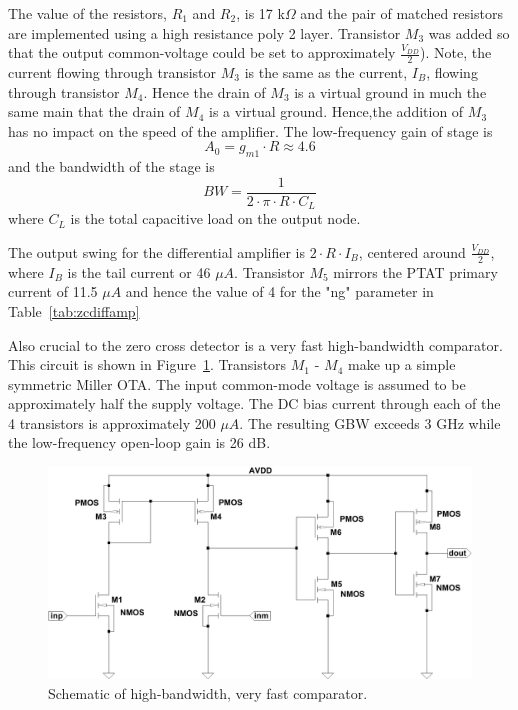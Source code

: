 \documentclass[12pt,oneside,final]{siuethesis}
\theoremstyle{definition}
\begin{document}
The value of the resistors, $R_1$ and $R_2$, is 17 k$\Omega$ and the pair of matched resistors are implemented using a high resistance poly 2 layer. Transistor $M_3$ was added so that the output common-voltage could be set to approximately $\frac{V_{DD}}{2}$). Note, the current flowing through transistor $M_3$ is the same as the current, $I_B$, flowing through transistor $M_4$. Hence the drain of $M_3$ is a virtual ground in much the same main that the drain of $M_4$ is a virtual ground. Hence,the addition of $M_3$ has no impact on the speed of the amplifier. The low-frequency gain of stage is
\begin{equation}
A_0 = g_{m1} \cdot R \approx 4.6
\end{equation}
and the bandwidth of the stage is 
\begin{equation}
BW = \frac{1}{2 \cdot \pi \cdot R \cdot C_L}
\end{equation}
where $C_L$ is the total capacitive load on the output node. 
\par The output swing for the differential amplifier is $ 2 \cdot R \cdot I_B$, centered around $\frac{V_{DD}}{2}$, where $I_B$ is the tail current or 46 $\mu A$.  Transistor $M_5$ mirrors the PTAT primary current of 11.5 $\mu A$ and hence the value of 4 for the "ng" parameter in Table~\ref{tab:zcdiffamp}
\par Also crucial to the zero cross detector is a very fast high-bandwidth comparator. This circuit is shown in Figure~\ref{fig:zccomp}. Transistors $M_1$ - $M_4$ make up a simple symmetric Miller OTA. The input common-mode voltage is assumed to be approximately half the supply voltage. The DC bias current through each of the 4 transistors is approximately 200 $\mu A$.  The resulting GBW exceeds 3 GHz while the low-frequency open-loop gain is 26 dB.  

\begin{figure}[htbp!]
	\centering
 	\includegraphics[scale=0.6,keepaspectratio=true]{../Design_Reports/CFD_circuit_report/images/zc_cmp.pdf}
 	\caption{Schematic of high-bandwidth, very fast comparator.}
 	\label{fig:zccomp}
\end{figure}
\end{document}
